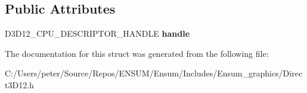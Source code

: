 \subsection*{Public Attributes}
\begin{DoxyCompactItemize}
\item 
D3\+D12\+\_\+\+C\+P\+U\+\_\+\+D\+E\+S\+C\+R\+I\+P\+T\+O\+R\+\_\+\+H\+A\+N\+D\+LE {\bfseries handle}\hypertarget{struct_ensum_1_1_graphics_1_1_direct3_d12_1_1_c_d3_d12___c_p_u___d_e_s_c_r_i_p_t_o_r___h_a_n_d_l_e_a74a4a3247d83196478b6d7615d1aa036}{}\label{struct_ensum_1_1_graphics_1_1_direct3_d12_1_1_c_d3_d12___c_p_u___d_e_s_c_r_i_p_t_o_r___h_a_n_d_l_e_a74a4a3247d83196478b6d7615d1aa036}

\end{DoxyCompactItemize}


The documentation for this struct was generated from the following file\+:\begin{DoxyCompactItemize}
\item 
C\+:/\+Users/peter/\+Source/\+Repos/\+E\+N\+S\+U\+M/\+Ensum/\+Includes/\+Ensum\+\_\+graphics/Direct3\+D12.\+h\end{DoxyCompactItemize}

